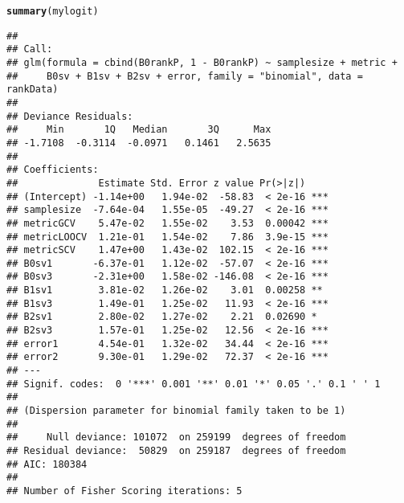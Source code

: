 \documentclass{article}\usepackage[]{graphicx}\usepackage[]{color}
\makeatletter
\newcommand{\hlstd}[1]{\textcolor[rgb]{0.345,0.345,0.345}{#1}}%
\newcommand{\hlkwd}[1]{\textcolor[rgb]{0.737,0.353,0.396}{\textbf{#1}}}%
\newenvironment{kframe}{%
 \def\at@end@of@kframe{}%
 \ifinner\ifhmode%
  \def\at@end@of@kframe{\end{minipage}}%
  \begin{minipage}{\columnwidth}%
 \fi\fi%
 \def\FrameCommand##1{\hskip\@totalleftmargin \hskip-\fboxsep
 \colorbox{shadecolor}{##1}\hskip-\fboxsep
     \hskip-\linewidth \hskip-\@totalleftmargin \hskip\columnwidth}%
 \MakeFramed {\advance\hsize-\width
   \@totalleftmargin\z@ \linewidth\hsize
   \@setminipage}}%
 {\par\unskip\endMakeFramed%
 \at@end@of@kframe}
\newenvironment{knitrout}{}{} %
\makeatother
\begin{document}
\begin{knitrout}
\begin{kframe}
{\ttfamily\noindent\color{warningcolor}{\#\# Warning: non-integer counts in a binomial glm!}}\begin{alltt}
\hlkwd{summary}\hlstd{(mylogit)}
\end{alltt}
\begin{verbatim}
## 
## Call:
## glm(formula = cbind(B0rankP, 1 - B0rankP) ~ samplesize + metric + 
##     B0sv + B1sv + B2sv + error, family = "binomial", data = rankData)
## 
## Deviance Residuals: 
##     Min       1Q   Median       3Q      Max  
## -1.7108  -0.3114  -0.0971   0.1461   2.5635  
## 
## Coefficients:
##              Estimate Std. Error z value Pr(>|z|)    
## (Intercept) -1.14e+00   1.94e-02  -58.83  < 2e-16 ***
## samplesize  -7.64e-04   1.55e-05  -49.27  < 2e-16 ***
## metricGCV    5.47e-02   1.55e-02    3.53  0.00042 ***
## metricLOOCV  1.21e-01   1.54e-02    7.86  3.9e-15 ***
## metricSCV    1.47e+00   1.43e-02  102.15  < 2e-16 ***
## B0sv1       -6.37e-01   1.12e-02  -57.07  < 2e-16 ***
## B0sv3       -2.31e+00   1.58e-02 -146.08  < 2e-16 ***
## B1sv1        3.81e-02   1.26e-02    3.01  0.00258 ** 
## B1sv3        1.49e-01   1.25e-02   11.93  < 2e-16 ***
## B2sv1        2.80e-02   1.27e-02    2.21  0.02690 *  
## B2sv3        1.57e-01   1.25e-02   12.56  < 2e-16 ***
## error1       4.54e-01   1.32e-02   34.44  < 2e-16 ***
## error2       9.30e-01   1.29e-02   72.37  < 2e-16 ***
## ---
## Signif. codes:  0 '***' 0.001 '**' 0.01 '*' 0.05 '.' 0.1 ' ' 1
## 
## (Dispersion parameter for binomial family taken to be 1)
## 
##     Null deviance: 101072  on 259199  degrees of freedom
## Residual deviance:  50829  on 259187  degrees of freedom
## AIC: 180384
## 
## Number of Fisher Scoring iterations: 5
\end{verbatim}
\end{kframe}
\end{knitrout}
\end{document}
